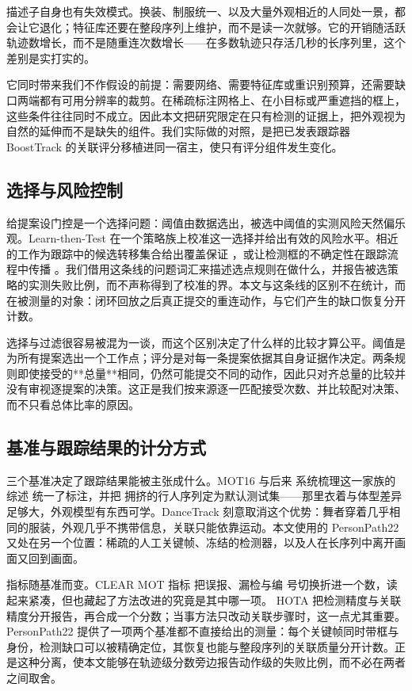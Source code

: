 描述子自身也有失效模式。换装、制服统一、以及大量外观相近的人同处一景，都会让它退化；特征库还要在整段序列上维护，而不是读一次就够。它的开销随活跃轨迹数增长，而不是随重连次数增长——在多数轨迹只存活几秒的长序列里，这个差别是实打实的。

它同时带来我们不作假设的前提：需要网络、需要特征库或重识别预算，还需要缺口两端都有可用分辨率的裁剪。在稀疏标注网格上、在小目标或严重遮挡的框上，这些条件往往同时不成立。因此本文把研究限定在只有检测的证据上，把外观视为自然的延伸而不是缺失的组件。我们实际做的对照，是把已发表跟踪器 BoostTrack \cite{stanjoevic2024boosttrack} 的关联评分移植进同一宿主，使只有评分组件发生变化。

\subsection{选择与风险控制}

给提案设门控是一个选择问题：阈值由数据选出，被选中阈值的实测风险天然偏乐观。Learn-then-Test \cite{angelopoulos2021learn} 在一个策略族上校准这一选择并给出有效的风险水平。相近的工作为跟踪中的候选转移集合给出覆盖保证 \cite{li2022pac}，或让检测框的不确定性在跟踪流程中传播 \cite{su2024motcup}。我们借用这条线的问题词汇来描述选点规则在做什么，并报告被选策略的实测失败比例，而不声称得到了校准的界。本文与这条线的区别不在统计，而在被测量的对象：闭环回放之后真正提交的重连动作，与它们产生的缺口恢复分开计数。

选择与过滤很容易被混为一谈，而这个区别决定了什么样的比较才算公平。阈值是为所有提案选出一个工作点；评分是对每一条提案依据其自身证据作决定。两条规则即使接受的**总量**相同，仍然可能提交不同的动作，因此只对齐总量的比较并没有审视逐提案的决策。这正是我们按来源逐一匹配接受次数、并比较配对决策、而不只看总体比率的原因。

\subsection{基准与跟踪结果的计分方式}

三个基准决定了跟踪结果能被主张成什么。MOT16 \cite{milan2016mot16} 与后来
系统梳理这一家族的综述 \cite{dendorfer2020motchallenge} 统一了标注，并把
拥挤的行人序列定为默认测试集——那里衣着与体型差异足够大，外观模型有东西可学。DanceTrack \cite{sun2022dancetrack} 刻意取消这个优势：舞者穿着几乎相同的服装，外观几乎不携带信息，关联只能依靠运动。本文使用的 PersonPath22 \cite{shuai2022personpath22} 又处在另一个位置：稀疏的人工关键帧、冻结的检测器，以及人在长序列中离开画面又回到画面。

指标随基准而变。CLEAR MOT 指标 \cite{bernardin2008clear} 把误报、漏检与编
号切换折进一个数，读起来紧凑，但也藏起了方法改进的究竟是其中哪一项。
HOTA \cite{luiten2021hota} 把检测精度与关联精度分开报告，再合成一个分数；当事方法只改动关联步骤时，这一点尤其重要。PersonPath22 提供了一项两个基准都不直接给出的测量：每个关键帧同时带框与身份，检测缺口可以被精确定位，其恢复也能与整段序列的关联质量分开计数。正是这种分离，使本文能够在轨迹级分数旁边报告动作级的失败比例，而不必在两者之间取舍。
